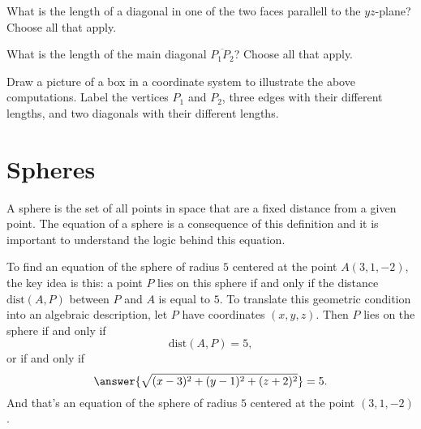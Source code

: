 \documentclass{ximera}
\begin{document}
\begin{question} \label{Q32sdfdsftgt}
What is the length of a diagonal in one of the two faces parallell to the $yz$-plane? Choose all that apply. 
\begin{selectAll}
\end{selectAll}
\end{question}

\begin{question} \label{Q32sdfdsftgt}
What is the length of the main diagonal $\overline{P_1P_2}$? Choose all that apply. 
\begin{selectAll}
\end{selectAll}
\end{question}

\begin{question}  \label{Q:Kmm3454433}
\begin{freeResponse}
Draw a picture of a box in a coordinate system to illustrate the above computations. Label the vertices $P_1$ and $P_2$,  three edges with their different lengths, and two diagonals with their different lengths. 
\end{freeResponse}
\end{question}

\section*{Spheres}
A sphere is the set of all points in space that are a fixed distance from a given point. The equation of a sphere is a consequence of this definition and it is important to understand the logic behind this equation.

\begin{question}   \label{QDfsdgfte}
To find an equation of the sphere of radius $5$ centered at the point $A(3,1,-2)$, the key idea is this: a point $P$ lies on this sphere  if and only if the distance $\text{dist}(A,P)$ between $P$ and $A$ is equal to $5$. To translate this geometric condition into an algebraic description, let $P$ have coordinates $(x,y,z)$. Then $P$ lies on the sphere if and only if
\[
   \text{dist}(A,P) = 5 ,
\]
or if and only if 
\[
      \answer{\sqrt{(x-3)^2+ (y-1)^2 + (z+2)^2}} = 5   .
\]
And that's an equation of the sphere of radius $5$ centered at the point $(3,1,-2)$.
\end{question}
\end{document}
